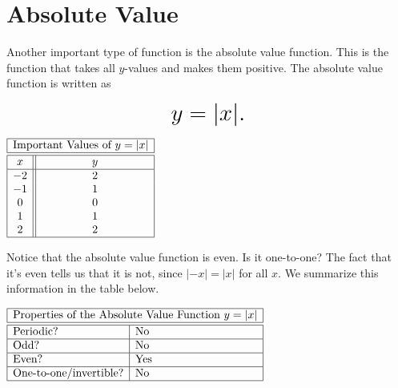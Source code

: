\documentclass[nooutcomes]{ximera}
\begin{document}
\newpage


\section{Absolute Value}
Another important type of function is the absolute value function.  This is the function that takes all $y$-values and makes them positive.  The absolute value function is written as 

$$ \mbox{\huge $y=|x|.$}$$ 

\begin{image}
\end{image}

\begin{center}
\(
\begin{array}{ |c || c|  }
 \hline
 \multicolumn{2}{|c|}{\text{\normalfont Important Values of } y=|x|} \\
\hline
 \hline
 x & y\\
 \hline
 -2&2\\ 
-1&1\\ 
0&0\\
 1&1\\
 2&2\\
 \hline
\end{array}
\)
\end{center}

Notice that the absolute value function is even. Is it one-to-one? The fact that it's even tells us that it is not, since $|-x| = |x|$ for all $x$. We summarize this information in the table below.

\begin{center}
$
\begin{array}{|l|l|}
 \hline
 \multicolumn{2}{|c|}{\text{\normalfont Properties of the Absolute Value Function } y=|x|} \\
\hline
 \hline
\text{Periodic?} & \text{No} \\ \hline
\text{Odd?} & \text{No} \\ \hline
\text{Even?} & \text{Yes } \\ \hline
\text{One-to-one/invertible?} & \text{No}\\ \hline
\end{array}
$
\end{center}
\end{document}
